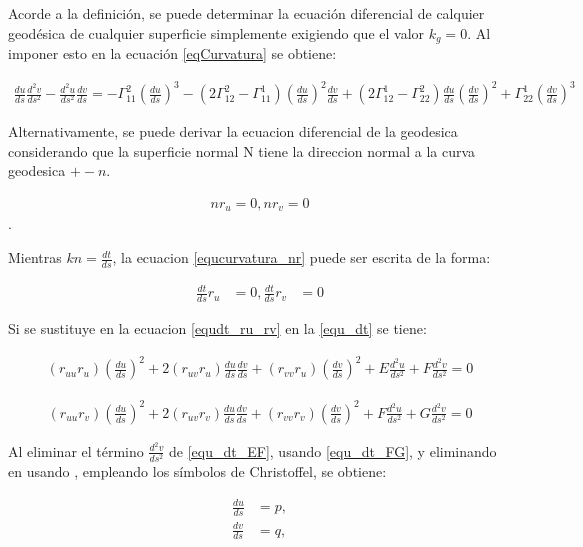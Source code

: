 \documentclass{endm}
\begin{document}
Acorde a la definici\'on, se puede determinar la ecuaci\'on diferencial de calquier geod\'esica de cualquier superficie simplemente exigiendo que el valor $k_g = 0$. Al imponer esto en la ecuaci\'on \ref{eqCurvatura} se obtiene:

\begin{align} 
\frac{du}{ds} \frac{d^2v}{ds^2} - \frac{d^2u}{ds^2} \frac{dv}{ds} = -  \Gamma_{11}^2 (\frac{du}{ds})^3 - (2 \Gamma_{12}^2 -  \Gamma_{11}^1 ) (\frac{du}{ds})^2 \frac{dv}{ds} + (2 \Gamma_{12}^1 - \Gamma_{22}^2) \frac{du}{ds} (\frac{dv}{ds})^2 + \Gamma_{22}^1 (\frac{dv}{ds})^3
\label{eqCurvatura}
\end{align}

Alternativamente, se puede derivar la ecuacion diferencial de la geodesica considerando que la superficie normal N tiene la direccion normal a la curva geodesica $+- n$.

\begin{align} 
n r_u = 0, n r_v = 0
\label{equcurvatura_nr}
\end{align}.

Mientras $kn = \frac{dt}{ds} $, la ecuacion 
\ref{equcurvatura_nr} 
puede ser escrita de la forma:

\begin{align} 
\frac{dt}{ds} r_u &=0,\frac{dt}{ds} r_v &=0
\label{equdt_ru_rv}
\end{align}

Si se sustituye en la ecuacion \ref{equdt_ru_rv} en la \ref{equ_dt} se tiene:

\begin{align} 
(r_{uu} r_u) (\frac{du}{ds})^2 + 2 (r_{uv} r_u) \frac{du}{ds} \frac{dv}{ds} + (r_{vv} r_u) (\frac{dv}{ds})^2 + E \frac{d^2u}{ds^2} + F \frac{d^2v}{ds^2} = 0
\label{equ_dt_EF}
\end{align}


\begin{align} 
(r_{uu} r_v) (\frac{du}{ds})^2 + 2 (r_{uv} r_v) \frac{du}{ds} \frac{dv}{ds} + (r_{vv} r_v) (\frac{dv}{ds})^2 + F \frac{d^2u}{ds^2} + G \frac{d^2v}{ds^2} = 0
\label{equ_dt_FG}
\end{align}

Al eliminar el t\'ermino $\frac{d^2v}{ds^2}$ de \ref{equ_dt_EF}, usando \ref{equ_dt_FG}, y eliminando en \label{equ_dt_FG} usando \label{equ_dt_EF}, empleando los s\'imbolos de Christoffel, se obtiene:

\begin{align} 
\frac{du}{ds}&=p, \label{equ1_Geo}\\
\frac{dv}{ds}&=q, \label{equ2_Geo}
\end{align}
\end{document}
